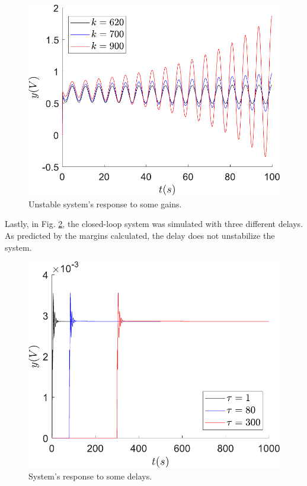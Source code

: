 \begin{figure}[H]
    \centering
    \includegraphics[scale=0.5]{figs/sineOutput/Lazo_cerrado_inestable.pdf}
    \caption{Unstable system's response to some gains.}
    \label{fig:response_gains_unstable}
\end{figure}

Lastly, in Fig. \ref{fig:response_delays}, the closed-loop system was simulated with three different delays. As predicted by the margins calculated, the delay does not unstabilize the system.

\begin{figure}[H]
    \centering
    \includegraphics[scale=0.5]{figs/sineOutput/Lazo_cerrado_retardo.pdf}
    \caption{System's response to some delays.}
    \label{fig:response_delays}
\end{figure}
